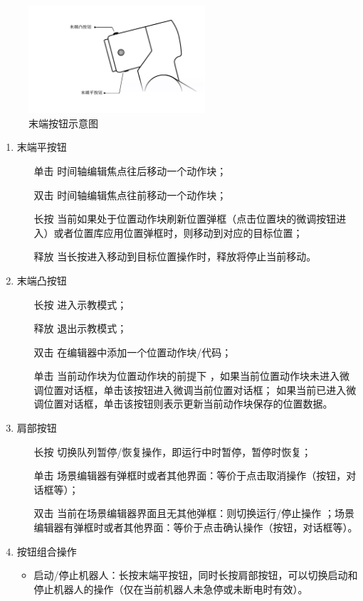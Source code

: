 \begin{figure}[ht]
	\centering
	\includegraphics[height=4cm]{line_graphs/flange_buttons.pdf}
	\caption{末端按钮示意图}
	\label{fig:末端按钮示意图}
\end{figure}

\begin{enumerate}[label=(\arabic*)]
	\item 末端平按钮
	\begin{itemize}
		\item[单击] 时间轴编辑焦点往后移动一个动作块；
		\item[双击] 时间轴编辑焦点往前移动一个动作块；
		\item[长按] 当前如果处于位置动作块刷新位置弹框（点击位置块的微调按钮进入）或者位置库应用位置弹框时，则移动到对应的目标位置；
		\item[释放] 当长按进入移动到目标位置操作时，释放将停止当前移动。
	\end{itemize}

	\item 末端凸按钮
	\begin{itemize}
		\item[长按] 进入示教模式；
		\item[释放] 退出示教模式；
		\item[双击] 在编辑器中添加一个位置动作块/代码；
		\item[单击] 当前动作块为位置动作块的前提下 ，如果当前位置动作块未进入微调位置对话框，单击该按钮进入微调当前位置对话框； 如果当前已进入微调位置对话框，单击该按钮则表示更新当前动作块保存的位置数据。
	\end{itemize}

	\item 肩部按钮
	\begin{itemize}
		\item[长按] 切换队列暂停/恢复操作，即运行中时暂停，暂停时恢复；
		\item[单击] 场景编辑器有弹框时或者其他界面：等价于点击取消操作（按钮，对话框等）；
		\item[双击] 当前在场景编辑器界面且无其他弹框：则切换运行/停止操作 ；场景编辑器有弹框时或者其他界面：等价于点击确认操作（按钮，对话框等）。
	\end{itemize}

	\item 按钮组合操作
	\begin{itemize}
		\item 启动/停止机器人：长按末端平按钮，同时长按肩部按钮，可以切换启动和停止机器人的操作（仅在当前机器人未急停或未断电时有效）。
	\end{itemize}
\end{enumerate}

